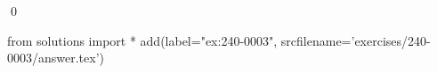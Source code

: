 
\begin{ex} 
  \label{ex:240-0003}
  
  \qed
\end{ex} 
\begin{python0}
from solutions import *
add(label="ex:240-0003",
    srcfilename='exercises/240-0003/answer.tex') 
\end{python0}
